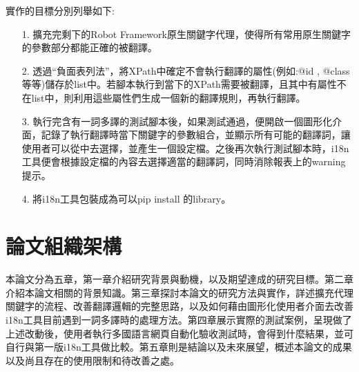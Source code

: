 實作的目標分別列舉如下:
\begin{itemize}
\item[1.] 擴充完剩下的Robot Framework原生關鍵字代理，使得所有常用原生關鍵字的參數部分都能正確的被翻譯。
\item[2.] 透過“負面表列法”，將XPath中確定不會執行翻譯的屬性(例如:@id , @class等等)儲存於list中。若腳本執行到當下的XPath需要被翻譯，且其中有屬性不在list中，則利用這些屬性們生成一個新的翻譯規則，再執行翻譯。
\item[3.] 執行完含有一詞多譯的測試腳本後，如果測試通過，便開啟一個圖形化介面，記錄了執行翻譯時當下關鍵字的參數組合，並顯示所有可能的翻譯詞，讓使用者可以從中去選擇，並產生一個設定檔。之後再次執行測試腳本時，i18n工具便會根據設定檔的內容去選擇適當的翻譯詞，同時消除報表上的warning提示。 
\item[4.] 將i18n工具包裝成為可以pip\cite{PIP} install 的library。
\end{itemize}

\section{論文組織架構}
本論文分為五章，第一章介紹研究背景與動機，以及期望達成的研究目標。第二章介紹本論文相關的背景知識。第三章探討本論文的研究方法與實作，詳述擴充代理關鍵字的流程、改善翻譯邏輯的完整思路，以及如何藉由圖形化使用者介面去改善i18n工具目前遇到一詞多譯時的處理方法。第四章展示實際的測試案例，呈現做了上述改動後，使用者執行多國語言網頁自動化驗收測試時，會得到什麼結果，並可自行與第一版i18n工具\cite{i18n}做比較。第五章則是結論以及未來展望，概述本論文的成果以及尚且存在的使用限制和待改善之處。